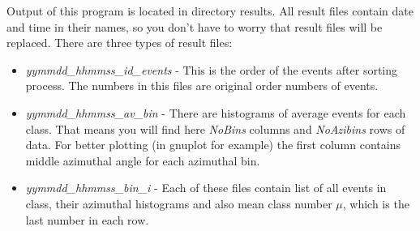 \documentclass[a4paper]{article}
\begin{document}
Output of this program is located in directory results. All result files contain date and time in their names, so you don't have to worry that result files will be replaced. There are three types of result files:
\begin{itemize}
\item \textit{yymmdd\_hhmmss\_id\_events} - This is the order of the events after sorting process. The numbers in this files are original order numbers of events.
\item \textit{yymmdd\_hhmmss\_av\_bin} - There are histograms of average events for each class. That means you will find here \textit{NoBins} columns and \textit{NoAzibins} rows of data. For better plotting (in gnuplot for example) the first column contains middle azimuthal angle for each azimuthal bin.
\item \textit{yymmdd\_hhmmss\_bin\_i} - Each of these files contain list of all events in class, their azimuthal histograms and also mean class number $\mu$, which is the last number in each row.
\end{itemize}
\end{document}
